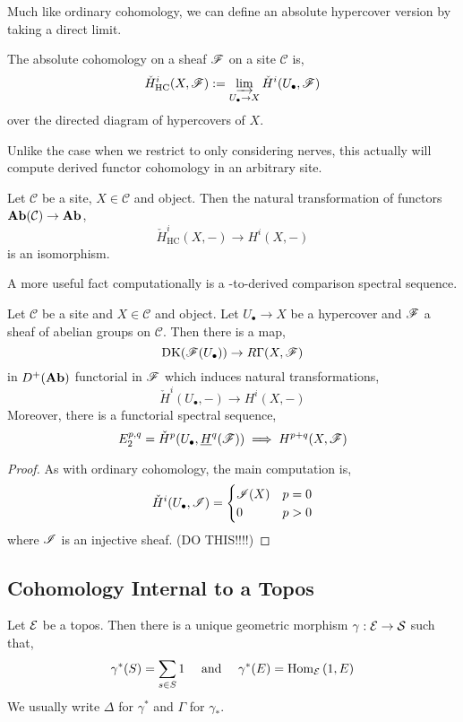 \documentclass[12pt]{article}
\renewcommand{\C}{\mathcal{C}}
\newcommand{\DK}{\mathrm{DK}}
\renewcommand{\Cech}{\text{\v{C}ech}\xspace}
\begin{document}
Much like ordinary \Cech cohomology, we can define an absolute hypercover version by taking a direct limit.

\begin{defn}
The absolute \Cech cohomology on a sheaf $\mathscr{F}$ on a site $\C$ is,
\[ \check{H}^i_{\text{HC}}(X, \mathscr{F}) := \operatorname*{\varinjlim}_{U_\bullet \to X} \check{H}^i(U_\bullet, \mathscr{F}) \]
over the directed diagram of hypercovers of $X$.
\end{defn}

Unlike the case when we restrict to only considering \Cech nerves, this actually will compute derived functor cohomology in an arbitrary site.

\begin{thm}
Let $\C$ be a site, $X \in \C$ and object. Then the natural transformation of functors $\Ab(\C) \to \Ab$,
\[ \check{H}^i_{\text{HC}}(X, -) \to H^i(X, -) \]
is an isomorphism.
\end{thm}

A more useful fact computationally is a \Cech-to-derived comparison spectral sequence.

\begin{prop}
Let $\C$ be a site and $X \in \C$ and object. Let $U_\bullet \to X$ be a hypercover and $\mathscr{F}$ a sheaf of abelian groups on $\C$. Then there is a map,
\[ \DK(\F(U_\bullet)) \to R \Gamma(X, \F) \]
in $D^+(\mathbf{Ab})$ functorial in $\mathscr{F}$ which induces natural transformations,
\[ \check{H}^i(U_\bullet, -) \to H^i(X, -) \]
Moreover, there is a functorial spectral sequence,
\[ E^{p,q}_2 = \check{H}^p(U_\bullet, \underline{H}^q(\mathscr{F})) \implies H^{p+q}(X, \mathscr{F}) \]
\end{prop}

\begin{proof}
As with ordinary \Cech cohomology, the main computation is,
\[ \check{H}^i(U_\bullet, \mathscr{I}) = 
\begin{cases}
\mathscr{I}(X) & p = 0
\\
0 & p > 0
\end{cases} \]
where $\mathscr{I}$ is an injective sheaf. (DO THIS!!!!)
\end{proof}

\subsection{Cohomology Internal to a Topos}

\begin{defn}
Let $\mathcal{E}$ be a topos. Then there is a unique geometric morphism $\gamma : \mathcal{E} \to \mathcal{S}$ such that,
\[ \gamma^*(S) = \sum_{s \in S} 1 \quad \text{ and } \quad \gamma^*(E) = \mathrm{Hom}_{\mathcal{E}} \left( 1, E \right) \]
We usually write $\Delta$ for $\gamma^*$ and $\Gamma$ for $\gamma_*$.
\end{defn}
\end{document}
